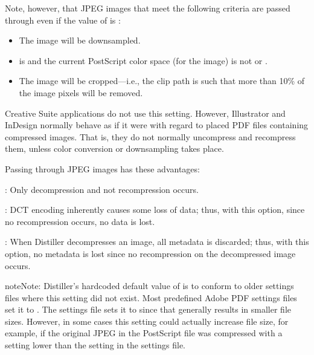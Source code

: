\documentclass[letterpaper,12pt,english,openany,oneside]{sphinxmanual}
\begin{document}
Note, however, that JPEG images that meet the following criteria are  passed through even if the value of  is  :
\begin{itemize}
\item {} 
The image will be downsampled.

\item {} 
 is  and the current PostScript color space (for the image) is not  or  .

\item {} 
The image will be cropped—i.e., the clip path is such that more than 10\% of the image pixels will be removed.

\end{itemize}

Creative Suite applications do not use this setting. However, Illustrator and InDesign normally behave as if it were  with regard to placed PDF files containing compressed images. That is, they do not normally uncompress and recompress them, unless color conversion or downsampling takes place.

Passing through JPEG images has these advantages:

 : Only decompression and not recompression occurs.

 : DCT encoding inherently causes some loss of data; thus, with this option, since no recompression occurs, no data is lost.

 : When Distiller decompresses an image, all metadata is discarded; thus, with this option, no metadata is lost since no recompression on the decompressed image occurs.

\begin{sphinxadmonition}{note}{Note:}
Distiller’s hard\sphinxhyphen{}coded default value of  is  to conform to older settings files where this setting did not exist. Most predefined Adobe PDF settings files set it to  . The  settings file sets it to  since that generally results in smaller file sizes. However, in some cases this setting could actually increase file size, for example, if the original JPEG in the PostScript file was compressed with a  setting lower than the  setting in the settings file.
\end{sphinxadmonition}
\label{\detokenize{PDF_Create_CommonSettings:supported-by-101}}
\end{document}
